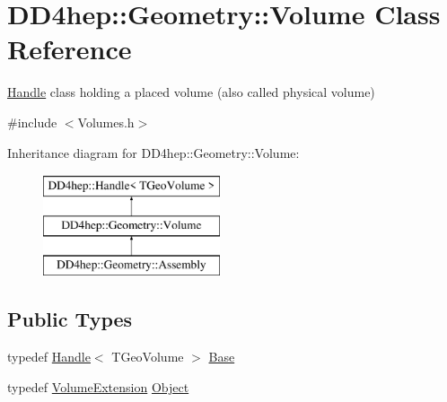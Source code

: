 \hypertarget{class_d_d4hep_1_1_geometry_1_1_volume}{}\section{D\+D4hep\+:\+:Geometry\+:\+:Volume Class Reference}
\label{class_d_d4hep_1_1_geometry_1_1_volume}


\hyperlink{class_d_d4hep_1_1_handle}{Handle} class holding a placed volume (also called physical volume)  




{\ttfamily \#include $<$Volumes.\+h$>$}

Inheritance diagram for D\+D4hep\+:\+:Geometry\+:\+:Volume\+:\begin{figure}[H]
\begin{center}
\leavevmode
\includegraphics[height=3.000000cm]{class_d_d4hep_1_1_geometry_1_1_volume}
\end{center}
\end{figure}
\subsection*{Public Types}
\begin{DoxyCompactItemize}
\item 
typedef \hyperlink{class_d_d4hep_1_1_handle}{Handle}$<$ T\+Geo\+Volume $>$ \hyperlink{class_d_d4hep_1_1_geometry_1_1_volume_ac9545eb97e81ed894b7192a26e4ef5a9}{Base}
\item 
typedef \hyperlink{class_d_d4hep_1_1_geometry_1_1_volume_extension}{Volume\+Extension} \hyperlink{class_d_d4hep_1_1_geometry_1_1_volume_a12968f95257e99e277f773ccf6d58ee5}{Object}
\end{DoxyCompactItemize}
